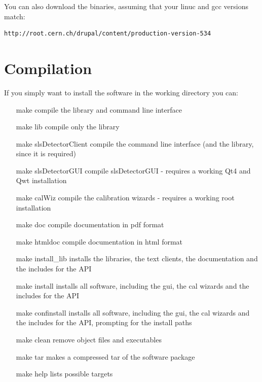 \documentclass{article}
\begin{document}
You can also download the binaries, assuming that your linuc and gcc versions match:
\begin{verbatim}
http://root.cern.ch/drupal/content/production-version-534
\end{verbatim}


\section{Compilation} 



If you simply want to install the software in the working directory you can:
\begin{itemize}
\item[make] compile the library and command line interface 

\item[make lib]     	compile only the library 

\item[make slsDetectorClient] compile the command line interface (and the library, since it is required)

\item[make slsDetectorGUI]  compile slsDetectorGUI - requires a working Qt4 and Qwt installation

\item[make calWiz] compile the calibration wizards - requires a working root installation

\item[make doc] compile documentation in pdf format

\item[make htmldoc] compile documentation in html format

\item[make install\_lib]        installs the libraries, the text clients, the documentation and the includes for the API

\item[make install]            installs all software, including the gui, the cal wizards and the includes for the API

\item[make confinstall]         installs all software, including the gui, the cal wizards and the includes for the API, prompting for the install paths

\item[make clean]              remove object files and executables

\item[make tar]              makes a compressed tar of the software package

\item[make help]               lists possible targets
\end{itemize}
\end{document}
